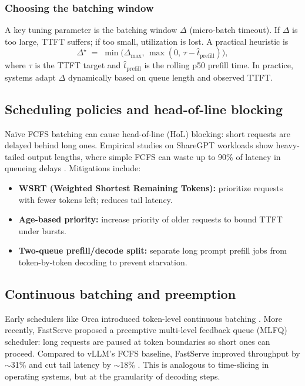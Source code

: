 \subsubsection{Choosing the batching window}
A key tuning parameter is the batching window $\Delta$ (micro-batch timeout). If $\Delta$ is too large, TTFT suffers; if too small, utilization is lost. A practical heuristic is
\[
\Delta^\star \;=\; \min\!\big(\Delta_{\max},\, \max(0,\, \tau - \hat{t}_{\mathrm{prefill}})\big),
\]
where $\tau$ is the TTFT target and $\hat{t}_{\mathrm{prefill}}$ is the rolling p50 prefill time. In practice, systems adapt $\Delta$ dynamically based on queue length and observed TTFT.

\subsection{Scheduling policies and head-of-line blocking}\label{sec:scheduling-hol}
Naïve FCFS batching can cause head-of-line (HoL) blocking: short requests are delayed behind long ones. Empirical studies on ShareGPT workloads show heavy-tailed output lengths, where simple FCFS can waste up to 90\% of latency in queueing delays \cite{pope2023exegpt}. Mitigations include:
\begin{itemize}
  \item \textbf{WSRT (Weighted Shortest Remaining Tokens):} prioritize requests with fewer tokens left; reduces tail latency.
  \item \textbf{Age-based priority:} increase priority of older requests to bound TTFT under bursts.
  \item \textbf{Two-queue prefill/decode split:} separate long prompt prefill jobs from token-by-token decoding to prevent starvation.
\end{itemize}

\subsection{Continuous batching and preemption}\label{sec:continuous-batching}
Early schedulers like Orca introduced token-level continuous batching \cite{pope2023exegpt}. More recently, FastServe proposed a preemptive multi-level feedback queue (MLFQ) scheduler: long requests are paused at token boundaries so short ones can proceed. Compared to vLLM’s FCFS baseline, FastServe improved throughput by $\sim$31\% and cut tail latency by $\sim$18\% \cite{pope2023exegpt}. This is analogous to time-slicing in operating systems, but at the granularity of decoding steps.


